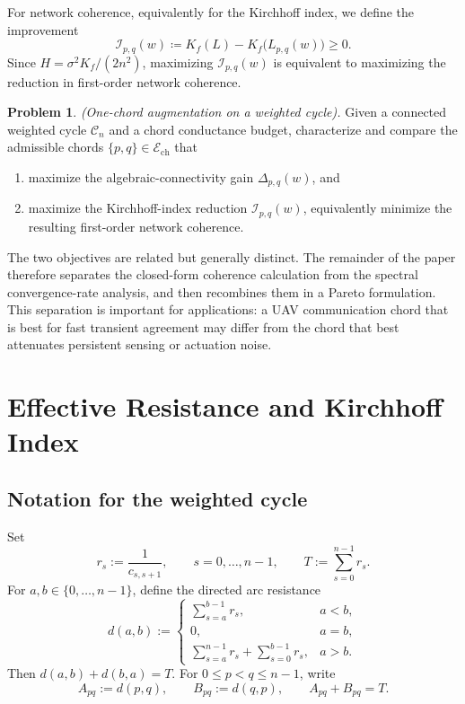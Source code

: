 \documentclass[11pt]{article}
\numberwithin{equation}{section}
\theoremstyle{definition}
\newtheorem{problem}[theorem]{Problem}
\theoremstyle{remark}
\begin{document}
For network coherence, equivalently for the Kirchhoff index, we define the
improvement
\begin{equation}\label{eq:I_pq_def}
	\mathcal{I}_{p,q}(w)
	\coloneqq
	K_f(L)-K_f\bigl(L_{p,q}(w)\bigr)\ge 0.
\end{equation}
Since $H=\sigma^2K_f/(2n^2)$, maximizing $\mathcal I_{p,q}(w)$ is
equivalent to maximizing the reduction in first-order network coherence.

\begin{problem}\emph{(One-chord augmentation on a weighted cycle).}
	Given a connected weighted cycle $\mathcal C_n$ and a chord conductance
	budget, characterize and compare the admissible chords
	$\{p,q\}\in\mathcal{E}_{\mathrm{ch}}$ that
	\begin{enumerate}
		\item maximize the algebraic-connectivity gain
		$\Delta_{p,q}(w)$, and
		\item maximize the Kirchhoff-index reduction
		$\mathcal I_{p,q}(w)$, equivalently minimize the resulting
		first-order network coherence.
	\end{enumerate}
\end{problem}

The two objectives are related but generally distinct. The remainder of the paper therefore separates the closed-form coherence calculation from the spectral convergence-rate analysis, and then recombines them in a Pareto formulation. This separation is important for applications: a UAV communication chord that is best for fast transient agreement may differ from the chord that best attenuates persistent sensing or actuation noise.


\section{Effective Resistance and Kirchhoff Index}\label{sec:resistance}

\subsection{Notation for the weighted cycle}

Set
\begin{equation*}
	r_s:=\frac1{c_{s,s+1}},\qquad s=0,\dots,n-1,
	\qquad
	T:=\sum_{s=0}^{n-1}r_s.
\end{equation*}
For $a,b\in\{0,\dots,n-1\}$, define the directed arc resistance
\begin{equation}\label{eq:directed_arc_resistance}
	d(a,b):=
	\begin{cases}
		\displaystyle\sum_{s=a}^{b-1}r_s, & a<b,\\[0.7em]
		0, & a=b,\\[0.7em]
		\displaystyle\sum_{s=a}^{n-1}r_s+\sum_{s=0}^{b-1}r_s, & a>b.
	\end{cases}
\end{equation}
Then $d(a,b)+d(b,a)=T$.
For $0\le p<q\le n-1$, write
\begin{equation}\label{eq:Apq_Bpq_def}
	A_{pq}:=d(p,q),
	\qquad
	B_{pq}:=d(q,p),
	\qquad
	A_{pq}+B_{pq}=T.
\end{equation}
\end{document}
